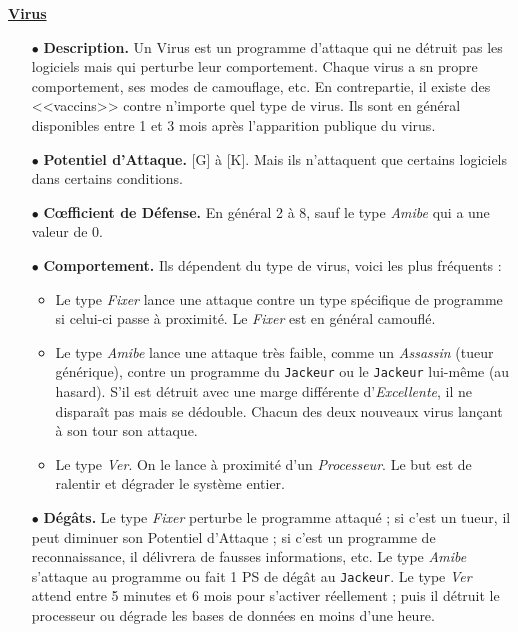 \documentclass[11pt,twoside,a4paper]{article}
\begin{document}
\begin{multicols*}{2}
\underline{\textbf{Virus}} %
\begin{itemize}
	\item[$\bullet$] \textbf{Description. }Un Virus est un programme d'attaque qui ne d{\'e}truit pas les logiciels mais qui perturbe leur comportement. Chaque virus a sn propre comportement, ses modes de camouflage, etc. En contrepartie, il existe des <<vaccins>> contre n'importe quel type de virus. Ils sont en g{\'e}n{\'e}ral disponibles entre 1 et 3 mois apr{\`e}s l'apparition publique du virus. 
	\item[$\bullet$] \textbf{Potentiel d'Attaque. }[G] {\`a} [K]. Mais ils n'attaquent que certains logiciels dans certains conditions. 
	\item[$\bullet$] \textbf{C\oe fficient de D{\'e}fense. }En g{\'e}n{\'e}ral 2 {\`a} 8, sauf le type \emph{Amibe} qui a une valeur de 0. 
	\item[$\bullet$] \textbf{Comportement. }Ils d{\'e}pendent du type de virus, voici les plus fr{\'e}quents : 
	\begin{itemize}
		\footnotesize
		\item Le type \emph{Fixer} lance une attaque contre un type sp{\'e}cifique de programme si celui-ci passe {\`a} proximit{\'e}. Le \emph{Fixer} est en g{\'e}n{\'e}ral camoufl{\'e}. 
		\item Le type \emph{Amibe} lance une attaque tr{\`e}s faible, comme un \emph{Assassin} (tueur g{\'e}n{\'e}rique), contre un programme du \texttt{Jackeur} ou le \texttt{Jackeur} lui-m{\^e}me (au hasard). S'il est d{\'e}truit avec une marge diff{\'e}rente d'\emph{Excellente}, il ne dispara{\^i}t pas mais se d{\'e}double. Chacun des deux nouveaux virus lan\c{c}ant {\`a} son tour son attaque. 
		\item Le type \emph{Ver}. On le lance {\`a} proximit{\'e} d'un \emph{Processeur}. Le but est de ralentir et d{\'e}grader le syst{\`e}me entier. 
	\end{itemize}
	\item[$\bullet$] \textbf{D{\'e}g{\^a}ts. }Le type \emph{Fixer} perturbe le programme attaqu{\'e} ; si c'est un tueur, il peut diminuer son Potentiel d'Attaque ; si c'est un programme de reconnaissance, il d{\'e}livrera de fausses informations, etc. Le type \emph{Amibe} s'attaque au programme ou fait 1 PS de d{\'e}g{\^a}t au \texttt{Jackeur}. Le type \emph{Ver} attend entre 5 minutes et 6 mois pour s'activer r{\'e}ellement ; puis il d{\'e}truit le processeur ou d{\'e}grade les bases de donn{\'e}es en moins d'une heure.  

\end{itemize}
\end{multicols*}
\end{document}
